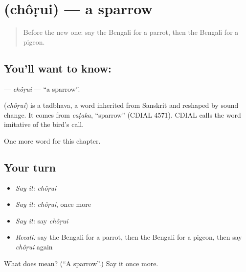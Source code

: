 \section[\texorpdfstring{\bn{চড়ুই} (chôṛui)}{চড়ুই (chôṛui)}]{ (chôṛui) — a sparrow}

\label{lesson:BN-C121-chorui}



\begin{quote}
Before the new one: say the Bengali for a parrot, then the Bengali for a pigeon.
\end{quote}

\subsection*{You'll want to know: }
\textbf{} — \emph{chôṛui} — \textquotedblleft{}a sparrow\textquotedblright{}.

\begin{cousinweb}
\textbf{} (\emph{chôṛui}) is a tadbhava, a word inherited from Sanskrit and reshaped by sound change. It comes from \emph{caṭaka}, \textquotedblleft{}sparrow\textquotedblright{} (CDIAL 4571). CDIAL calls the word imitative of the bird's call.
\end{cousinweb}

\begin{grammarlens}[title={What you've built}]
One more word for this chapter.
\end{grammarlens}

\subsection*{Your turn}
\begin{itemize}
\raggedright
  \item \emph{Say it:} \emph{chôṛui}
  \item \emph{Say it:} \emph{chôṛui}, once more
  \item \emph{Say it:} say \emph{chôṛui}
  \item \emph{Recall:} say the Bengali for a parrot, then the Bengali for a pigeon, then say \emph{chôṛui} again
\end{itemize}

\begin{tcolorbox}[breakable,colback=teal!4,colframe=teal!35!black,title={Before you move on}]
What does  mean? (\textquotedblleft{}A sparrow\textquotedblright{}.) Say it once more.
\end{tcolorbox}
